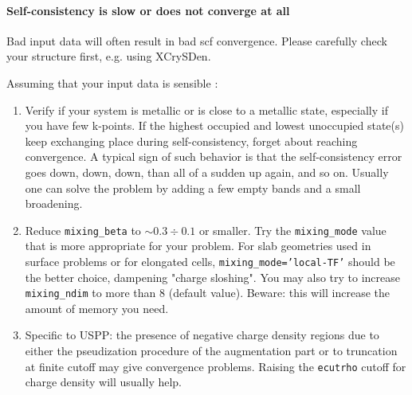 \documentclass[12pt,a4paper]{article}
\begin{document}

\paragraph{Self-consistency is slow or does not converge at all}

Bad input data will often result in bad scf convergence. Please 
carefully check your structure first, e.g. using XCrySDen.
 
Assuming that your input data is sensible :
\begin{enumerate}
\item Verify if your system is metallic or is close to a metallic
  state, especially if you have few k-points. If the highest occupied
  and lowest unoccupied state(s) keep exchanging place during
  self-consistency, forget about reaching convergence. A typical sign
  of such behavior is that the self-consistency error goes down, down,
  down, than all of a sudden up again, and so on. Usually one can
  solve the problem by adding a few empty bands and a small
  broadening. 
\item Reduce \texttt{mixing\_beta} to $\sim 0.3\div
  0.1$ or smaller. Try the \texttt{mixing\_mode} value that is more
  appropriate for your problem. For slab geometries used in surface
  problems or for elongated cells,  \texttt{mixing\_mode='local-TF'}
  should be the better choice, dampening "charge sloshing". You may
  also try to increase \texttt{mixing\_ndim} to more than 8 (default
  value). Beware: this will increase the amount of memory you need. 
\item Specific to USPP: the presence of negative charge density
  regions due to either the pseudization procedure of the augmentation
  part or to truncation at finite cutoff may give convergence
  problems. Raising the \texttt{ecutrho} cutoff for charge density will
  usually help.
\end{enumerate}
\end{document}
